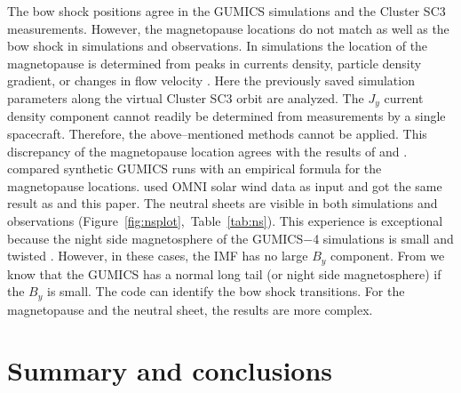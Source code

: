 \documentclass[draft]{agujournal2019}
\begin{document}
The bow shock positions agree in the GUMICS simulations and the Cluster SC3 measurements. However, the magnetopause locations do not match as well as the bow shock in simulations and observations. In simulations the location of the magnetopause is determined from peaks in currents density, particle density gradient, or changes in flow velocity \cite[see references therein]{siscoe01:_magnet_fluop,garcia07:_findin_lyon_fedder_mobar,gordeev13:_verif_gumic_mhd}. Here the previously saved simulation parameters along the virtual Cluster SC3 orbit are analyzed. The $J_{y}$ current density component cannot readily be determined from measurements by a single spacecraft. Therefore, the above--mentioned methods cannot be applied. This discrepancy of the magnetopause location agrees with the results of  and .  compared synthetic GUMICS runs with an empirical formula for the magnetopause locations.  used OMNI solar wind data as input and got the same result as  and this paper. The neutral sheets are visible in both simulations and observations (Figure~\ref{fig:nsplot},~Table~\ref{tab:ns}). This experience is exceptional because the night side magnetosphere of the GUMICS$-$4 simulations is small and twisted \cite{gordeev13:_verif_gumic_mhd,facsko16:_one_earth}. However, in these cases, the IMF has no large $B_{y}$ component. From  we know that the GUMICS has a normal long tail (or night side magnetosphere) if the $B_{y}$ is small. The code can identify the bow shock transitions. For the magnetopause and the neutral sheet, the results are more complex.

\section{Summary and conclusions}
\label{sec:concl}
\end{document}
